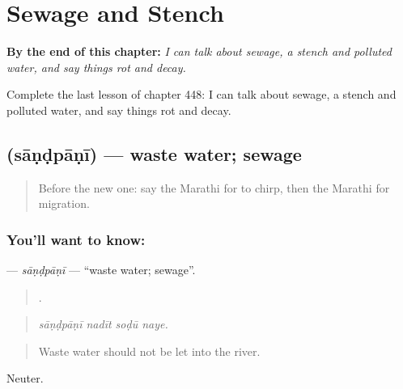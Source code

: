 
\chapter{Sewage and Stench}
\label{ch:mr-sewage-and-stench}

\begin{chapteropening}
\textbf{By the end of this chapter:} \emph{I can talk about sewage, a stench and polluted water, and say things rot and decay.}

Complete the last lesson of chapter 448: I can talk about sewage, a stench and polluted water, and say things rot and decay.
\end{chapteropening}

\section[\texorpdfstring{\mr{सांडपाणी} (sāṇḍpāṇī)}{सांडपाणी (sāṇḍpāṇī)}]{ (sāṇḍpāṇī) — waste water; sewage}

\label{lesson:MR-C448-sandpani}



\begin{quote}
Before the new one: say the Marathi for to chirp, then the Marathi for migration.
\end{quote}

\subsection*{You'll want to know: }
\textbf{} — \emph{sāṇḍpāṇī} — \textquotedblleft{}waste water; sewage\textquotedblright{}.

\begin{quote}
   .
\end{quote}

\begin{quote}
\emph{sāṇḍpāṇī nadīt soḍū naye.}
\end{quote}

\begin{quote}
Waste water should not be let into the river.
\end{quote}

Neuter.

